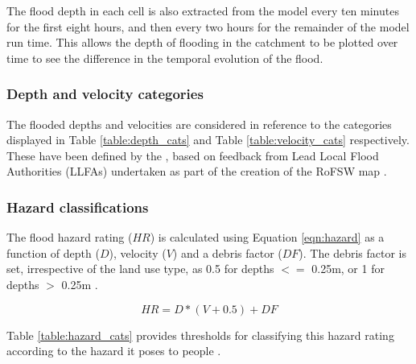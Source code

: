 \documentclass[APA,Times2COL]{WileyNJDv5}
\begin{document}
The flood depth in each cell is also extracted from the model every ten minutes for the first eight hours, and then every two hours for the remainder of the model run time. This allows the depth of flooding in the catchment to be plotted over time to see the difference in the temporal evolution of the flood.  

\subsubsection{Depth and velocity categories}\label{sec:sec:depth_cat}
The flooded depths and velocities are considered in reference to the categories displayed in Table \ref{table:depth_cats} and Table \ref{table:velocity_cats} respectively. These have been defined by the \citet{environment2019risk}, based on feedback from Lead Local Flood Authorities (LLFAs) undertaken as part of the creation of the RoFSW map \citep{environment2019risk}. 

\subsubsection{Hazard classifications}\label{subsec:hazard}
The flood hazard rating ($HR$) is calculated using Equation \ref{eqn:hazard} as a function of depth ($D$), velocity ($V$) and a debris factor ($DF$). The debris factor is set, irrespective of the land use type, as 0.5 for depths $<=$ 0.25m, or 1 for depths $>$ 0.25m \citep{environment2019risk}.

\begin{equation}
HR = D * (V +0.5) + DF
  \label{eqn:hazard}
\end{equation}

Table \ref{table:hazard_cats} provides thresholds for classifying this hazard rating according to the hazard it poses to people \citep{surendran2008supplementary}.

\end{document}
